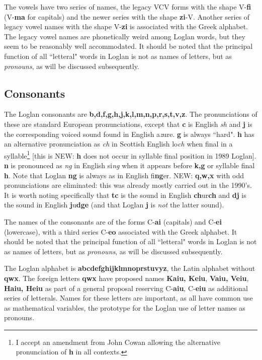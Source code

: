 \documentclass[12pt]{book}
\begin{document}
The vowels have two series of names, the legacy VCV forms with the shape V-{\bf fi} (V-{\bf ma} for capitals) and the newer series with the shape {\bf zi}-V.  Another series of legacy vowel names with the shape V-{\bf zi} is associated with the Greek alphabet.  The legacy vowel names are phonetically weird among Loglan words, but they seem to be reasonably well accommodated.  It should be noted that the principal function of all ``letteral" words in Loglan is not as names of letters, but as {\em pronouns\/}, as will be discussed subsequently.
\subsection{Consonants}

The Loglan consonants are {\bf b,d,f,g,h,j,k,l,m,n,p,r,s,t,v,z}.  The pronunciations of these are standard European pronunciations, except that {\bf c} is English {\em sh} and {\bf j} is the corresponding voiced sound found in English a{\em z}ure.  {\bf g} is always ``hard".  {\bf h} has an alternative pronunciation as {\em ch} in Scottish English lo{\em ch} when final in a syllable\footnote{I accept an amendment from John Cowan allowing the alternative pronunciation of {\bf h} in all contexts.} [this is NEW:  {\bf h} does not occur in syllable final position in 1989 Loglan].  {\bf n} is pronounced as {\em ng} in English si{\em ng} when it appears before {\bf k,g} or syllable final {\bf h}.  Note that Loglan {\bf ng} is always as in English fi{\bf ng}er.  NEW:  {\bf q,w,x} with odd pronunciations are eliminated:  this was already mostly carried out in the 1990's.  It is worth noting specifically that {\bf tc} is the sound in English {\bf ch}ur{\bf ch} and {\bf dj} is the sound in English {\bf j}u{\bf dge} (and that Loglan {\bf j} is {\em not\/} the latter sound).

The names of the consonants are of the forms C-{\bf ai} (capitals) and C-{\bf ei} (lowercase), with a third series C-{\bf eo} associated with the Greek alphabet.   It should be noted that the principal function of all ``letteral" words in Loglan is not as names of letters, but as {\em pronouns\/}, as will be discussed subsequently.  

The Loglan alphabet is {\bf abcdefghijklmnoprstuvyz}, the Latin alphabet without {\bf qwx}.  The foreign letters {\bf qwx}
have proposed names {\bf Kaiu, Keiu}, {\bf Vaiu, Veiu}, {\bf Haiu, Heiu} as part of a general proposal reserving C-{\bf aiu}, C-{\bf eiu} as additional series of letterals.    Names for these letters are important, as all have common use as mathematical variables, the prototype for the Loglan use of letter names as pronouns.
\end{document}
